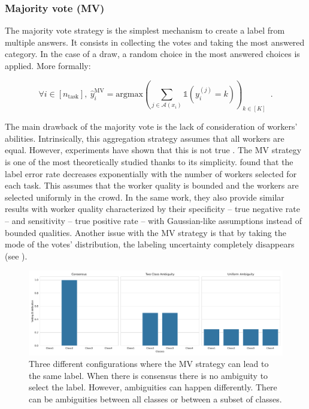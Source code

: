 \subsubsection{Majority vote (MV)}
\label{subsub:mv}

The majority vote strategy is the simplest mechanism to create a label from multiple answers.
It consists in collecting the votes and taking the most answered category.
In the case of a draw, a random choice in the most answered choices is applied.
More formally:

\begin{equation}\label{eq:mv}
    \forall i\in [n_\text{task}],\ \hat y_i^{\mathrm{MV}} = \mathrm{argmax} \left(\sum_{j\in\mathcal{A}(x_i)} \mathds{1}(y_i^{(j)}=k)\right)_{k\in[K]} \enspace.
\end{equation}

The main drawback of the majority vote is the lack of consideration of workers' abilities.
Intrinsically, this aggregation strategy assumes that all workers are equal.
However, experiments have shown that this is not true \citep{snow_cheap_2008,vuurens2011much}.
The MV strategy is one of the most theoretically studied thanks to its simplicity.
\citet{wang2015crowdsourcing} found that the label error rate decreases exponentially with the number of workers selected for each task. This assumes that the worker quality is bounded and the workers are selected uniformly in the crowd.
In the same work, they also provide similar results with worker quality characterized by their specificity -- true negative rate -- and sensitivity -- true positive rate -- with Gaussian-like assumptions instead of bounded qualities.
Another issue with the MV strategy is that by taking the mode of the votes' distribution, the labeling uncertainty completely disappears (see ).

\begin{figure}[htb]
    \centering
    \includegraphics[width=.96\textwidth]{chapters/images/ambiguity.pdf}
    \caption{Three different configurations where the MV strategy can lead to the same label. When there is consensus there is no ambiguity to select the label. However, ambiguities can happen differently. There can be ambiguities between all classes or between a subset of classes.}
    \label{fig:confusion-types}
\end{figure}

